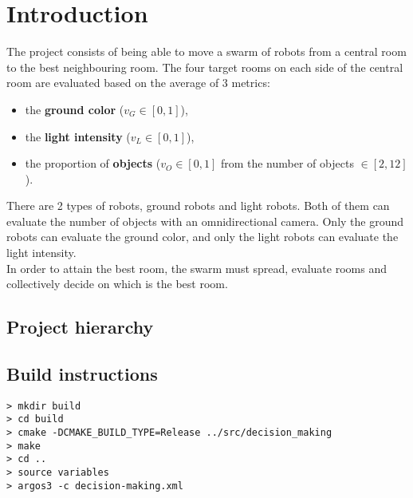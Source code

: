 \section{Introduction}

The project consists of being able to move a swarm of robots from a central room
to the best neighbouring room. The four target rooms on each side of the central
room are evaluated based on the average of 3 metrics:

\begin{itemize}
    \item the \textbf{ground color} ($v_G \in [0,1]$),
    \item the \textbf{light intensity} ($v_L \in [0,1]$),
    \item the proportion of \textbf{objects} ($v_O \in [0,1]$ from the number
    of objects
$\in [2,12]$).
\end{itemize}

\noindent There are 2 types of robots, ground robots and light robots. Both of
them can evaluate the number of objects with an omnidirectional camera. Only the
ground robots can evaluate the ground color, and only the light robots can
evaluate the light intensity.\\

\noindent In order to attain the best room, the swarm must spread, evaluate rooms and
collectively decide on which is the best room.

\subsection{Project hierarchy}

\begin{framed}
\end{framed}

\subsection {Build instructions}

\begin{lstlisting}
> mkdir build
> cd build
> cmake -DCMAKE_BUILD_TYPE=Release ../src/decision_making
> make
> cd ..
> source variables
> argos3 -c decision-making.xml
\end{lstlisting}

\newpage
